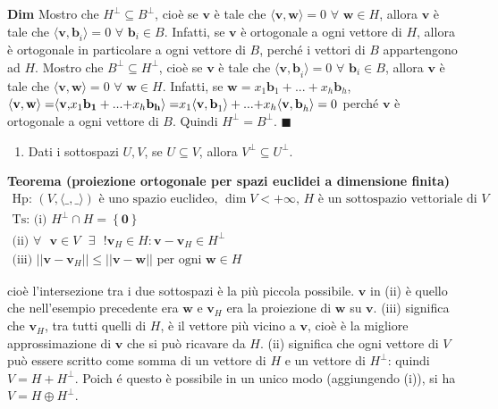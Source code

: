 \documentclass{article}
\begin{document}
\textbf{Dim} Mostro che $H^{\perp }\subseteq B^{\perp }$, cio\`{e} se $%
\mathbf{v}$ \`{e} tale che $\langle \mathbf{v,w\rangle }=0$ $\forall $ $%
\mathbf{w}\in H$, allora $\mathbf{v}$ \`{e} tale che $\langle \mathbf{v,b}%
_{i}\rangle =0$ $\forall $ $\mathbf{b}_{i}\in B$. Infatti, se $\mathbf{v}$ 
\`{e} ortogonale a ogni vettore di $H$, allora \`{e} ortogonale in
particolare a ogni vettore di $B$, perch\'{e} i vettori di $B$ appartengono
ad $H$. Mostro che $B^{\perp }\subseteq H^{\perp }$, cio\`{e} se $\mathbf{v}$
\`{e} tale che $\langle \mathbf{v,b}_{i}\rangle =0$ $\forall $ $\mathbf{b}%
_{i}\in B$, allora $\mathbf{v}$ \`{e} tale che $\langle \mathbf{v,w\rangle }%
=0$ $\forall $ $\mathbf{w}\in H$. Infatti, se $\mathbf{w}=x_{1}\mathbf{b}%
_{1}+...+x_{h}\mathbf{b}_{h}$, $\langle \mathbf{v,w\rangle =}\langle \mathbf{%
v,}x_{1}\mathbf{\mathbf{b}_{1}+...+}x_{h}\mathbf{\mathbf{b}_{h}\rangle =}%
x_{1}\langle \mathbf{v,b}_{1}\mathbf{\rangle +...+}x_{h}\langle \mathbf{v,b}%
_{h}\rangle =0$ perch\'{e} $\mathbf{v}$ \`{e} ortogonale a ogni vettore di $%
B $. Quindi $H^{\perp }=B^{\perp }$. $\blacksquare $

\begin{enumerate}
\item Dati i sottospazi $U,V$, se $U\subseteq V$, allora $V^{\perp
}\subseteq U^{\perp }$.
\end{enumerate}

\textbf{Teorema (proiezione ortogonale per spazi euclidei a dimensione
finita)}%
\begin{gather*}
\text{Hp}\text{: }\left( V,\langle \_,\_\mathbf{\rangle }\right) \text{ \`{e}
uno spazio euclideo, }\dim V<+\infty \text{, }H\text{ \`{e} un sottospazio
vettoriale di }V \\
\text{Ts}\text{: (i) }H^{\perp }\cap H=\left\{ \mathbf{0}\right\}  \\
\text{(ii) }\forall \text{ }\mathbf{v}\in V\text{ }\exists \text{ }!\mathbf{v%
}_{H}\in H:\mathbf{v-v}_{H}\in H^{\perp } \\
\text{(iii) }\left\vert \left\vert \mathbf{v-v}_{H}\right\vert \right\vert
\leq \left\vert \left\vert \mathbf{v-w}\right\vert \right\vert \text{ per
ogni }\mathbf{w}\in H
\end{gather*}

cio\`{e} l'intersezione tra i due sottospazi \`{e} la pi\`{u} piccola
possibile. $\mathbf{v}$ in (ii) \`{e} quello che nell'esempio precedente era 
$\mathbf{w}$ e $\mathbf{v}_{H}$ era la proiezione di $\mathbf{w}$ su $%
\mathbf{v}$. (iii) significa che $\mathbf{v}_{H}$, tra tutti quelli di $H$, 
\`{e} il vettore pi\`{u} vicino a $\mathbf{v}$, cio\`{e} \`{e} la migliore
approssimazione di $\mathbf{v}$ che si pu\`{o} ricavare da $H$. (ii)
significa che ogni vettore di $V$ pu\`{o} essere scritto come somma di un
vettore di $H$ e un vettore di $H^{\perp }$: quindi $V=H+H^{\perp }$. Poich%
\'{e} questo \`{e} possibile in un unico modo (aggiungendo (i)), si ha $%
V=H\oplus H^{\perp }$.
\end{document}
